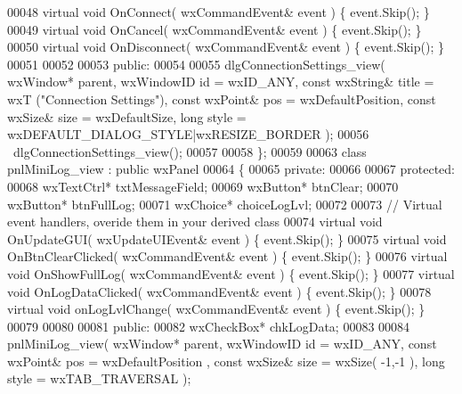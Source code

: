 \begin{DoxyCode}
00048         \textcolor{keyword}{virtual} \textcolor{keywordtype}{void} OnConnect( wxCommandEvent& event ) \{ \textcolor{keyword}{event}.Skip(); \}
00049         \textcolor{keyword}{virtual} \textcolor{keywordtype}{void} OnCancel( wxCommandEvent& event ) \{ \textcolor{keyword}{event}.Skip(); \}
00050         \textcolor{keyword}{virtual} \textcolor{keywordtype}{void} OnDisconnect( wxCommandEvent& event ) \{ \textcolor{keyword}{event}.Skip(); \}
00051         
00052     
00053     \textcolor{keyword}{public}:
00054         
00055         dlgConnectionSettings_view( wxWindow* parent, wxWindowID \textcolor{keywordtype}{id} = wxID\_ANY, \textcolor{keyword}{const} wxString& title = wxT
      (\textcolor{stringliteral}{"Connection Settings"}), \textcolor{keyword}{const} wxPoint& pos = wxDefaultPosition, \textcolor{keyword}{const} wxSize& 
      size = wxDefaultSize, \textcolor{keywordtype}{long} style = wxDEFAULT\_DIALOG\_STYLE|wxRESIZE\_BORDER ); 
00056         ~dlgConnectionSettings_view();
00057     
00058 \};
00059 
00063 \textcolor{keyword}{class }pnlMiniLog_view : \textcolor{keyword}{public} wxPanel 
00064 \{
00065     \textcolor{keyword}{private}:
00066     
00067     \textcolor{keyword}{protected}:
00068         wxTextCtrl* txtMessageField;
00069         wxButton* btnClear;
00070         wxButton* btnFullLog;
00071         wxChoice* choiceLogLvl;
00072         
00073         \textcolor{comment}{// Virtual event handlers, overide them in your derived class}
00074         \textcolor{keyword}{virtual} \textcolor{keywordtype}{void} OnUpdateGUI( wxUpdateUIEvent& event ) \{ \textcolor{keyword}{event}.Skip(); \}
00075         \textcolor{keyword}{virtual} \textcolor{keywordtype}{void} OnBtnClearClicked( wxCommandEvent& event ) \{ \textcolor{keyword}{event}.Skip(); \}
00076         \textcolor{keyword}{virtual} \textcolor{keywordtype}{void} OnShowFullLog( wxCommandEvent& event ) \{ \textcolor{keyword}{event}.Skip(); \}
00077         \textcolor{keyword}{virtual} \textcolor{keywordtype}{void} OnLogDataClicked( wxCommandEvent& event ) \{ \textcolor{keyword}{event}.Skip(); \}
00078         \textcolor{keyword}{virtual} \textcolor{keywordtype}{void} onLogLvlChange( wxCommandEvent& event ) \{ \textcolor{keyword}{event}.Skip(); \}
00079         
00080     
00081     \textcolor{keyword}{public}:
00082         wxCheckBox* chkLogData;
00083         
00084         pnlMiniLog_view( wxWindow* parent, wxWindowID \textcolor{keywordtype}{id} = wxID\_ANY, \textcolor{keyword}{const} wxPoint& pos = wxDefaultPosition
      , \textcolor{keyword}{const} wxSize& size = wxSize( -1,-1 ), \textcolor{keywordtype}{long} style = wxTAB\_TRAVERSAL ); 

\end{DoxyCode}
